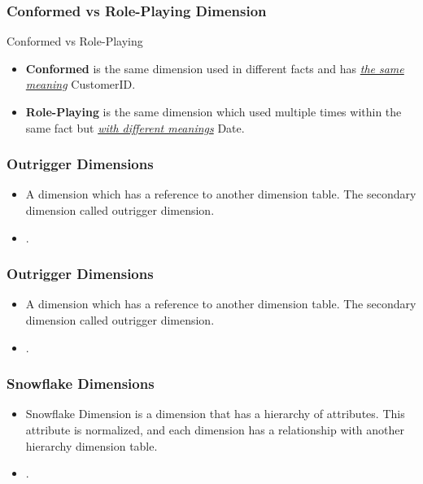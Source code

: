 \begin{frame}
    \frametitle{Conformed vs Role-Playing Dimension}
    \begin{block}{Conformed vs Role-Playing}
        \begin{itemize}
            \item \textbf{Conformed} is the same dimension used in different facts and has \textit{\underline{the same meaning}} \forexample CustomerID.
            \item \textbf{Role-Playing} is the same dimension which used multiple times within the same fact but \textit{\underline{with different meanings}} \forexample Date.
        \end{itemize}
    \end{block}
\end{frame}
\begin{frame}
    \frametitle{Outrigger Dimensions}
    \begin{itemize}[<+->]
        \item A dimension which has a reference to another dimension table. The secondary dimension called outrigger dimension.
        \item {}.
    \end{itemize}
\end{frame}
\begin{frame}
    \frametitle{Outrigger Dimensions}
    \begin{itemize}
        \item A dimension which has a reference to another dimension table. The secondary dimension called outrigger dimension.\\
        \item {}.
    \end{itemize}
    \centering
    
\end{frame}
\begin{frame}
    \frametitle{Snowflake Dimensions}
    \begin{itemize}[<+->]
        \item Snowflake Dimension is a dimension that has a hierarchy of attributes. This attribute is normalized, and each dimension has a relationship with another hierarchy dimension table.\\
        \item {}.
    \end{itemize}
\end{frame}

